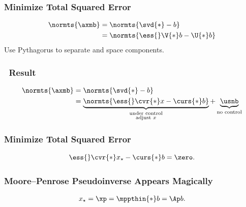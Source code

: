 \begin{frame}
\frametitle{Minimize Total Squared Error}
	{\large{
\begin{equation}
\begin{split}
	\normts{ \axmb } 
		&= \normts{\svd{*} - b} \\
		&= \normts{\ess{} \V{*}b - \U{*}b }
\end{split}
\end{equation}
	Use Pythagorus to separate  and  space components.
	}}
\end{frame}

\begin{frame}
\frametitle{\ls \ Result}
	{\large{
\begin{equation}
\begin{split}
	\normts{ \axmb } 
		&= \normts{\svd{*} - b} \\
		&= \underbrace{\normts{ \ess{} \cvr{*} x -\curs{*} b  }}_{\substack{\text{under control}\\\text{adjust }x}} + \underbrace{ \usnb }_{\text{no control}}
\end{split}
\end{equation}
	}}
\end{frame}

\begin{frame}
\frametitle{Minimize Total Squared Error}
	{\large{
\begin{equation}
	\ess{} \cvr{*} x_{\star} - \curs{*} b = \zero.
\end{equation}
	}}
\end{frame}

\begin{frame}
\frametitle{Moore--Penrose Pseudoinverse Appears Magically}
	{\large{
\begin{equation}
	\begin{array}{lcr}
		x_{\star} = \xp = \mppthin{*} b  = \Ap b.
	\end{array}
\label{eq:thunderbolt}
\end{equation}
}}
\end{frame}


\endinput  %


\begin{frame}
\frametitle{\ls \ Result}
	{\large{
	}}
\end{frame}

\begin{frame}
	\frametitle{\bf{Establishing \bMut}}
	{\large{
	\begin{equation}
		
	\end{equation}
	}}
\end{frame}

